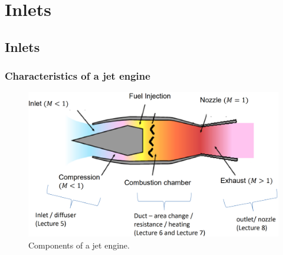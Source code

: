 \chapter{Inlets}
\section{Inlets}
\subsection{Characteristics of a jet engine}
\begin{figure}[H]
    \centering
    \includegraphics[width = \textwidth]{./img/diagram37.png}
    \caption{Components of a jet engine.}
\end{figure}
